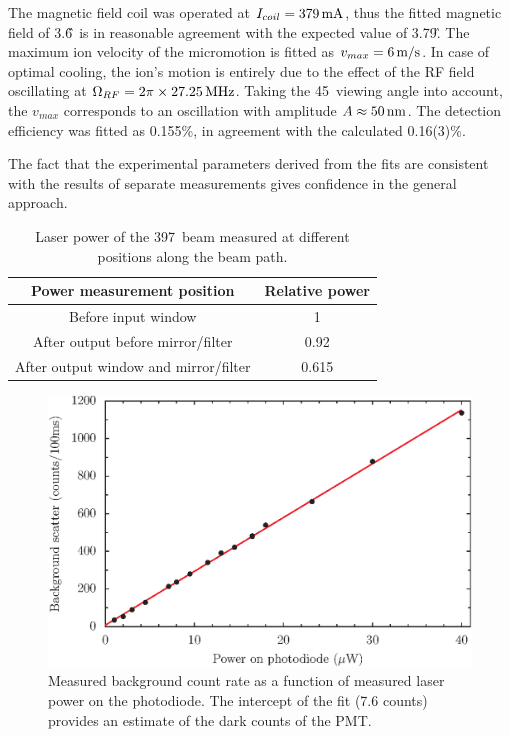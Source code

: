 The magnetic field coil was operated at $I_{coil} = 379\,\mbox{mA}$, thus the fitted magnetic field of 3.6\G\, is in reasonable agreement with the expected value of 3.79\G. 
The maximum ion velocity of the micromotion is fitted as $v_{max} = 6\,\mbox{m/s}$. In case of optimal cooling, the ion's motion is entirely due to the effect of the RF field oscillating at $\Omega_{RF} = 2\pi \times 27.25\,\mbox{MHz}$. Taking the 45\degree\, viewing angle into account, the $v_{max}$ corresponds to an oscillation with amplitude $A \approx 50 \,\mbox{nm}$.
The detection efficiency was fitted as 0.155\%, in agreement with the calculated 0.16(3)\%.

The fact that the experimental parameters derived from the fits are consistent with the results of separate measurements gives confidence in the general approach. 

\begin{table}[t]
 \begin{center}
\begin{tabular}{|c|c|}
\hline
\textbf{Power measurement position} & \textbf{Relative power} \\ 
\hline
Before input window 			& 1 \\ 
After output before mirror/filter 	& 0.92 \\ 
After output window and mirror/filter 	& 0.615 \\
\hline
\end{tabular}
\end{center}
\caption{Laser power of the 397\nm\, beam measured at different positions along the beam path.}
\label{tab:relativepower}
\end{table}


\begin{figure}[t]
\centering
\includegraphics{chapter7/saturation/background_v4}
\caption[Background counts as function of laser power]{Measured background count rate as a function of measured laser power on the photodiode. The intercept of the fit (7.6 counts) provides an estimate of the dark counts of the PMT.}
\label{fig:397satbg}
\end{figure} 

